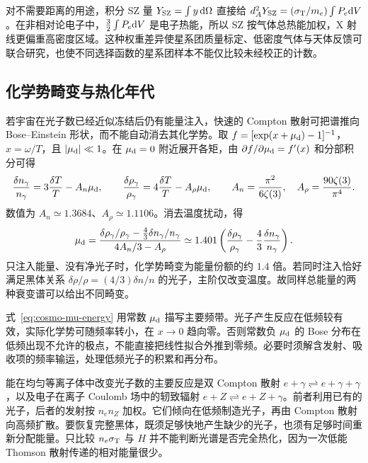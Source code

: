 对不需要距离的用途，积分 SZ 量 $Y_{\rm SZ}=\int y\,\dd\Omega$ 直接给 $d_A^2Y_{\rm SZ}=(\sigma_{\rm T}/m_e)\int P_e\dd V$。在非相对论电子中，$\tfrac32\int P_e\dd V$ 是电子热能，所以 SZ 按气体总热能加权，X 射线更偏重高密度区域。这种权重差异使星系团质量标定、低密度气体与天体反馈可联合研究，也使不同选择函数的星系团样本不能仅比较未经校正的计数。

\subsection{化学势畸变与热化年代}

若宇宙在光子数已经近似冻结后仍有能量注入，快速的 Compton 散射可把谱推向 Bose--Einstein 形状，而不能自动消去其化学势。取 $f=[\exp(x+\mu_{\rm d})-1]^{-1}$，$x=\omega/T$，且 $|\mu_{\rm d}|\ll1$。在 $\mu_{\rm d}=0$ 附近展开各矩，由 $\partial f/\partial\mu_{\rm d}=f'(x)$ 和分部积分可得
\[
 \frac{\delta n_\gamma}{n_\gamma}
 =3\frac{\delta T}{T}-A_n\mu_{\rm d},\qquad
 \frac{\delta\rho_\gamma}{\rho_\gamma}
 =4\frac{\delta T}{T}-A_\rho\mu_{\rm d},\qquad
 A_n=\frac{\pi^2}{6\zeta(3)},\quad
 A_\rho=\frac{90\zeta(3)}{\pi^4}.
\]
数值为 $A_n\simeq1.3684$、$A_\rho\simeq1.1106$。消去温度扰动，得
\begin{equation}\label{eq:cosmo-mu-energy}
 \mu_{\rm d}=
 \frac{\delta\rho_\gamma/\rho_\gamma-\frac43\delta n_\gamma/n_\gamma}
 {4A_n/3-A_\rho}
 \simeq1.401\left(\frac{\delta\rho_\gamma}{\rho_\gamma}
                  -\frac43\frac{\delta n_\gamma}{n_\gamma}\right).
\end{equation}
只注入能量、没有净光子时，化学势畸变为能量份额的约 $1.4$ 倍。若同时注入恰好满足黑体关系 $\delta\rho/\rho=(4/3)\delta n/n$ 的光子，主阶仅改变温度。故同样总能量的两种衰变谱可以给出不同畸变。

式~\eqref{eq:cosmo-mu-energy} 用常数 $\mu_{\rm d}$ 描写主要频带。光子产生反应在低频较有效，实际化学势可随频率转小，在 $x\to0$ 趋向零。否则常数负 $\mu_{\rm d}$ 的 Bose 分布在低频出现不允许的极点，不能直接把线性拟合外推到零频。必要时须解含发射、吸收项的频率输运，处理低频光子的积累和再分布。

能在均匀等离子体中改变光子数的主要反应是双 Compton 散射 $e+\gamma\rightleftharpoons e+\gamma+\gamma$，以及电子在离子 Coulomb 场中的轫致辐射 $e+Z\rightleftharpoons e+Z+\gamma$。前者利用已有的光子，后者的发射按 $n_en_Z$ 加权。它们倾向在低频制造光子，再由 Compton 散射向高频扩散。要恢复完整黑体，既须足够快地产生缺少的光子，也须有足够时间重新分配能量。只比较 $n_e\sigma_{\rm T}$ 与 $H$ 并不能判断光谱是否完全热化，因为一次低能 Thomson 散射传递的相对能量很少。

